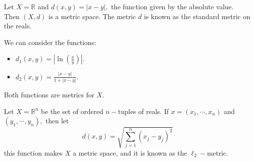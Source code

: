\documentclass[
	fontsize=10pt, %
	twoside=false, %
	secnumdepth=1, %
]{kaobook}
\begin{document}
\begin{example}
Let $X=\mathbb{R}$ and $d(x,y)=|x-y|,$ the function given by the absolute value. Then $(X,d)$ is a metric space. The metric $d$ is known as the standard metric on the reals.

We can consider the functions:
\begin{itemize}
\item $d_1(x,y)=\left|\ln\left(\frac{x}{y}\right)\right|.$

\item $d_2(x,y)=\frac{|x-y|}{1+|x-y|}.$
\end{itemize}

Both functions are metrics for $X.$
\end{example}

\begin{example}
Let $X=\mathbb{R}^n$ be the set of ordered $n-$tuples of reals. If $x=(x_1,\cdots,x_n)$ and $(y_1,\cdots,y_n),$ then let $$d(x,y)=\sqrt{\sum_{j=1}^n (x_j-y_j)^2}$$ this function makes $X$ a metric space, and it is known as the $\ell_2-$metric.
\end{example}
%
%
%


\end{document}
